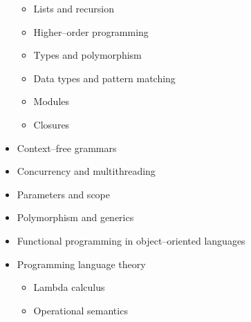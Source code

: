 \documentclass[10pt]{article}
\begin{document}
\begin{multicols}{2}
\begin{itemize}
              \vspace{-2.5mm}

              \begin{itemize}

                \addtolength{\itemsep}{-.5mm}

                \item Lists and recursion

                \item Higher--order programming

                \item Types and polymorphism

                \item Data types and pattern matching

                \item Modules

                \item Closures

              \end{itemize}

              \vspace{-2mm}

        \item Context--free grammars

        \item Concurrency and multithreading

        \item Parameters and scope

        \item Polymorphism and generics

        \item Functional programming in object--oriented languages

        \item Programming language theory

              \vspace{-2mm}

              \begin{itemize}

                \addtolength{\itemsep}{-.5mm}

                \item Lambda calculus

                \item Operational semantics

              \end{itemize}


\end{itemize}
\end{multicols}
\end{document}

